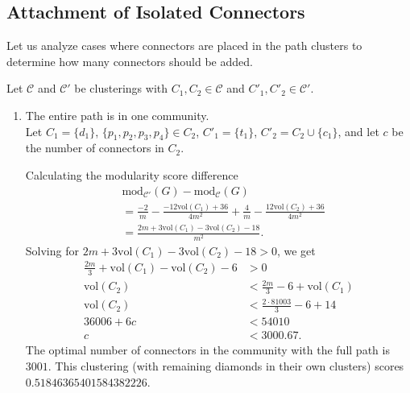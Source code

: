 \documentclass[letterpaper,12pt]{article}
\begin{document}
\subsection{Attachment of Isolated Connectors}
Let us analyze cases where connectors are placed in the path clusters to determine how many connectors should be added.

Let $\mathcal{C}$ and $\mathcal{C'}$ be clusterings with $C_1, C_2 \in \mathcal{C}$ and $C'_1, C'_2 \in \mathcal{C'}$.

\begin{enumerate}
      \item The entire path is in one community.\\
            Let $C_1 = \{d_1\}$, $\{p_1, p_2, p_3, p_4\} \in C_2$, $C'_1 = \{t_1\}$, $C'_2 = C_2 \cup \{c_1\}$, and let $c$ be the number of connectors in $C_2$.

            Calculating the modularity score difference
            \begin{align*}
                   & \text{mod}_{\mathcal{C'}}(G) - \text{mod}_{\mathcal{C}} (G)                                             \\
                   & = \frac{-2}{m} - \frac{-12\text{vol}(C_1) + 36}{4m^2} + \frac{4}{m} - \frac{12\text{vol}(C_2)+36}{4m^2} \\
                   & = \frac{2m + 3\text{vol}(C_1) - 3\text{vol}(C_2) - 18}{m^2}.
            \end{align*}
            Solving for $2m + 3\text{vol}(C_1) - 3\text{vol}(C_2) - 18 > 0$, we get
            \begin{align*}
                  \frac{2m}{3} + \text{vol}(C_1) - \text{vol}(C_2) - 6 & > 0                                  \\
                  \text{vol}(C_2)                                      & < \frac{2m}{3} - 6 + \text{vol}(C_1) \\
                  \text{vol}(C_2)                                      & < \frac{2\cdot 81003}{3} - 6 + 14    \\
                  36006 + 6c                                           & < 54010                              \\
                  c                                                    & < 3000.67.
            \end{align*}
            The optimal number of connectors in the community with the full path is $3001$. This clustering (with remaining diamonds in their own clusters) scores $0.51846365401584382226$.


\end{enumerate}
\end{document}

